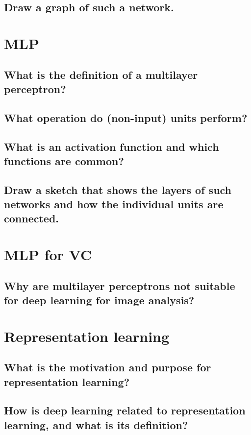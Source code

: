 \subsection{Draw a graph of such a network.}

\section{MLP}
\subsection{What is the definition of a multilayer perceptron?}
\subsection{What operation do (non-input) units perform?}
\subsection{What is an activation function and which functions are common?}
\subsection{Draw a sketch that shows the layers of such networks and how the individual units are connected.}

\section{MLP for VC}
\subsection{Why are multilayer perceptrons not suitable for deep learning for image analysis?}

\section{Representation learning}
\subsection{What is the motivation and purpose for representation learning?}
\subsection{How is deep learning related to representation learning, and what is its definition?}

